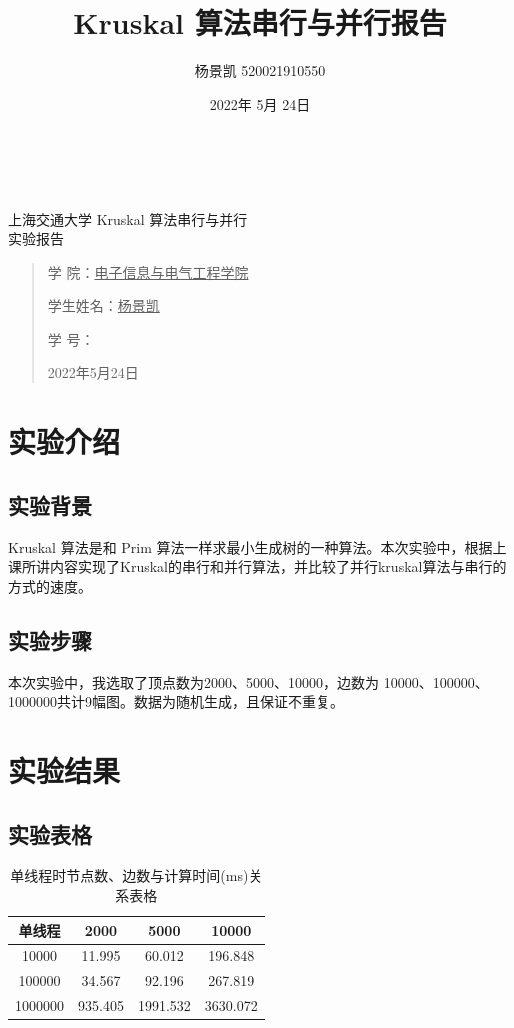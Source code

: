 \documentclass[UTF8]{ctexart}
\title{Kruskal 算法串行与并行报告}
\author{杨景凯 520021910550}
\date{2022年 5月 24日}
\begin{document}
\begin{center}
    \quad \\
    \quad \\
    \kaishu \fontsize{45}{17} 上\quad 海\quad 交\quad 通\quad 大\quad 学
    \vskip 3.5cm
    \heiti {} Kruskal 算法串行与并行\\
    实验报告
\end{center}
\vskip 3.5cm
\begin{quotation}
    \songti \fontsize{30}{30}
    \doublespacing
    \par\setlength\parindent{12em}
    \quad 
\begin{center}
    学\hspace{0.61cm} 院：\underline{电子信息与电气工程学院}

    学生姓名：\underline{\qquad    \quad \quad 杨景凯    \quad  \quad\qquad }

    学\hspace{0.61cm} 号：\underline{\quad \quad{}\quad\quad}
\end{center}
    \centering
    2022年5月24日
\end{quotation}

\clearpage
\tableofcontents

\clearpage
\section{实验介绍\cite{refpdf1}}
\subsection{实验背景}
Kruskal 算法是和 Prim 算法一样求最小生成树的一种算法。本次实验中，根据上课所讲内容实现了Kruskal的串行和并行算法，并比较了并行kruskal算法与串行的方式的速度。

\subsection{实验步骤}
本次实验中，我选取了顶点数为2000、5000、10000，边数为 10000、100000、1000000共计9幅图。数据为随机生成，且保证不重复。

\section{实验结果}
\subsection{实验表格}
\begin{table}[H]
    \centering
    \begin{tabular}{|c|c|c|c|}
        \hline
        单线程&	2000&	5000&	10000\\
        \hline
        10000&	11.995&	60.012&	196.848\\
        \hline
        100000&	34.567&	92.196&	267.819\\
        \hline
        1000000&	935.405&	1991.532&	3630.072\\
        \hline
    \end{tabular}
    \caption{单线程时节点数、边数与计算时间(ms)关系表格}
\end{table}
\end{document}
